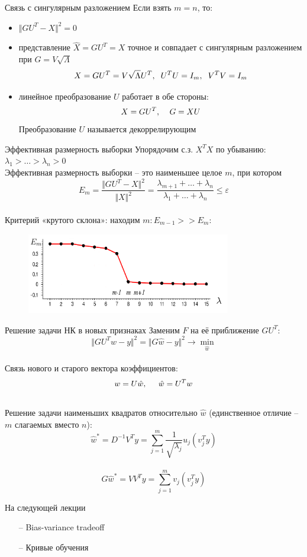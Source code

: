 \documentclass[10pt]{beamer}
\begin{document}
\begin{frame}{Связь с сингулярным разложением}
	Если взять $m = n$, то:\\
	\begin{itemize}[<+->]
	\item $\Vert GU^T - X \Vert^2 = 0$
	\item представление $\hat{X} = GU^T = X$ точное и совпадает с сингулярным разложением при $G = V \sqrt{\Lambda}$
	$$X = GU^T = V\sqrt{\Lambda}U^T, \hspace{2mm} U^TU = I_m, \hspace{2mm} V^TV = I_m$$
	\item линейное преобразование $U$ работает в обе стороны:\\
	$$X = GU^T, \hspace{4mm} G=XU$$
	Преобразование $U$ называется декоррелирующим
	\end{itemize}
\end{frame}

\begin{frame}{Эффективная размерность выборки}
	Упорядочим с.з. $X^TX$ по убыванию: $\lambda_1 > \dots > \lambda_n > 0$\\
	Эффективная размерность выборки -- это наименьшее целое $m$, при котором\\
	$$E_m = \frac{\Vert GU^T - X \Vert^2}{\Vert X \Vert^2} = \frac{\lambda_{m+1} + \dots + \lambda_{n}}{\lambda_1 + \dots + \lambda_n} \leq \varepsilon$$\\
	\pause
	Критерий «крутого склона»: находим $m: E_{m-1} >> E_m$:
	\begin{figure}[htbp]
	  \includegraphics[height=100pt, keepaspectratio = true]{images/edge}   
	\end{figure}
\end{frame}

\begin{frame}{Решение задачи НК в новых признаках}
	Заменим $F$ на её приближение $GU^T$:\\
	$$\Vert GU^Tw -y \Vert^2 = \Vert G\hat{w} -y \Vert^2 \rightarrow \min\limits_{\hat{w}}$$\\
	Связь нового и старого вектора коэффициентов:\\
	$$w = U\hat{w}, \hspace{5mm} \hat{w} = U^T w$$\\
	\pause
	\bigbreak
	Решение задачи наименьших квадратов относительно $\hat{w}$ (единственное отличие -- $m$ слагаемых вместо $n$):\\
	$$\hat{w}^* = D^{-1}V^Ty = \sum\limits_{j=1}^m \frac{1}{\sqrt{\lambda_j}} u_j (v_j^Ty)$$\\
	$$G\hat{w}^* = VV^Ty = \sum\limits_{j=1}^m v_j (v_j^Ty)$$
\end{frame}

\begin{frame}{На следующей лекции}
	\begin{itemize}
    	\item[--] Bias-variance tradeoff
    	\item[--] Кривые обучения 
	\end{itemize}
\end{frame}
\end{document}
